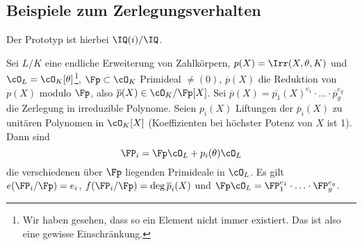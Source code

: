 \renewcommand{\lecdate}{17.12.2014}

\subsection{Beispiele zum Zerlegungsverhalten}

Der Prototyp ist hierbei $\IQ(i)/\IQ$.

\begin{Satz}[KUMMER]
 Sei $L/K$ eine endliche Erweiterung von Zahlkörpern, $p(X)=\Irr(X,\theta,K)$ und $\cO_L=\cO_K[\theta]$\footnote{Wir haben gesehen, dass so ein Element nicht immer existiert. Das ist also eine gewisse Einschränkung.}, $\Fp\subset\cO_K$ Primideal $\neq (0)$, $\overline p(X)$ die Reduktion von $p(X)$ modulo $\Fp$, also $\overline{p}(X)\in\cO_K/\Fp[X]$. Sei $\overline{p}(X)=\overline{p_1}(X)^{e_1}\cdot\ldots\cdot \overline p_g^{e_g}$ die Zerlegung in irreduzible Polynome. Seien $p_i(X)$ Liftungen der $\overline p_i(X)$ zu unitären Polynomen in $\cO_K[X]$ (Koeffizienten bei höchster Potenz von $X$ ist 1). Dann sind
 \[ \FP_i=\Fp\cO_L + p_i(\theta)\cO_L\]
 die verschiedenen über $\Fp$ liegenden Primideale in $\cO_L$. Es gilt $e(\FP_i/\Fp)=e_i$, $f(\FP_i/\Fp)=\deg \overline{p}_i(X)$ und $\Fp\cO_L=\FP_1^{e_1}\cdot\ldots\cdot\FP_g^{e_g}$.
\end{Satz}

